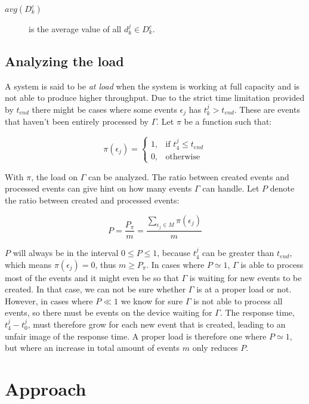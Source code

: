 \begin{description}

    \item[$avg(D_k^c)$] is the average value of all $d_k^j \in D_k^c$.

\end{description}

\subsection{Analyzing the load}
\label{sec:load}

A system is said to be \textit{at load} when the system is working at full
capacity and is not able to produce higher throughput. Due to the
strict time limitation provided by $t_{end}$ there might be cases where some
events $\epsilon_j$ has $t_k^j > t_{end}$. These are events that haven't
been entirely processed by $\Gamma$. Let $\pi$ be a function such that:

\[
    \pi(\epsilon_j) =
\begin{cases}
    1, & \text{if } t_4^j \leq t_{end} \\
    0, & \text{otherwise}
\end{cases}
\]

With $\pi$, the load on $\Gamma$ can be analyzed. The ratio between created
events and processed events can give hint on how many events $\Gamma$ can
handle. Let $P$ denote the ratio between created and processed events:

$$
P = \frac{P_\pi}{m} = \frac{\sum_{\epsilon_j \in M}{\pi(\epsilon_j)}}{m}
$$

$P$ will always be in the interval $0 \leq P \leq 1$, because $t_4^j$ can be
greater than $t_{end}$, which means $\pi(\epsilon_j) = 0$, thus $m \geq P_\pi$.
In cases where $P \simeq 1$, $\Gamma$ is able to process most of the events and
it might even be so that $\Gamma$ is waiting for new events to be created. In
that case, we can not be sure whether $\Gamma$ is at a proper load or not.
However, in cases where $P \ll 1$ we know for sure $\Gamma$ is not able to
process all events, so there must be events on the device waiting for $\Gamma$.
The response time, $t_4^j - t_0^j$, must therefore grow for each new event that
is created, leading to an unfair image of the response time. A proper load is
therefore one where $P \simeq 1$, but where an increase in total amount of
events $m$ only reduces $P$.

\section{Approach}


